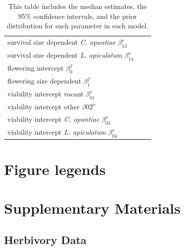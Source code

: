 \documentclass[11pt]{article}
\begin{document}
\begin{table}[]
\begin{tabular}{l|l|l}
    survival size dependent \textit{C. opuntiae} $\beta_{13}^s$ & & \\
    survival size dependent \textit{L. apiculatum} $\beta_{14}^s$ & & \\
    \hline
    flowering intercept $\beta_0^f$ & & \\
    flowering size dependent $\beta_1^f$ & & \\
    \hline
    viability intercept vacant $\beta_01^v$ & & \\
    viability intercept other $\beta02^v$ & & \\
    viability intercept \textit{C. opuntiae} $\beta_03^v$ & & \\
    viability intercept \textit{L. apiculatum} $\beta_04^v$ & & 

  \end{tabular}
  \caption{This table includes the median estimates, the 95$\%$ confidence intervals, and the prior distribution for each parameter in each model.}
  \label{tab:Params}
  \end{table}

\section*{Figure legends}

\section*{Supplementary Materials}
\subsection*{Herbivory Data}
\end{document}
